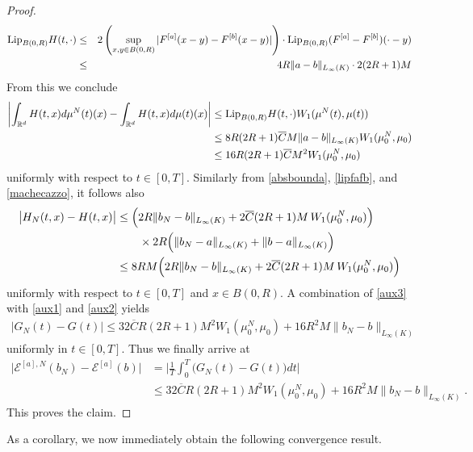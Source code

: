 \begin{proof}
\begin{eqnarray*}
\textup{Lip}_{B(0,R)}H(t,\cdot)&\leq& 2 \left (\sup_{x,y \in B(0,R)}|F^{[a]}(x-y)-F^{[b]}(x-y)| \right ) \cdot\textup{Lip}_{B(0,R)}(F^{[a]} -F^{[b]})(\cdot -y) \\
&\leq& 4R\|a-b\|_{L_\infty(K)}\cdot 2(2R+1)M
\end{eqnarray*}
	From this we conclude
	\begin{align}\label{aux1}
		\left|\int_{\mathbb{R}^d}H(t,x)d\mu^N(t)(x) - \int_{\mathbb{R}^d}H(t,x)d\mu(t)(x)\right|
			&\leq\textup{Lip}_{B(0,R)}H(t,\cdot)W_1(\mu^N(t),\mu(t))\nonumber\\
			&\leq 8R(2R+1)\overline{C}M\|a-b\|_{L_\infty(K)}W_1(\mu_0^N,\mu_0)\nonumber\\
			&\leq 16R(2R+1)\overline{C}M^2 W_1(\mu_0^N,\mu_0)
	\end{align}
	uniformly with respect to $t \in [0,T]$. Similarly from \eqref{absbounda}, \eqref{lipfafb}, and \eqref{machecazzo}, it follows also
	\begin{align}\label{aux2}
		\bigl|H_N(t,x)-H(t,x)\bigr|
			&\leq \Bigl(2R \| b_{N}-b\|_{L_\infty(K)}+2 \overline{C}(2R+1)M\,W_1(\mu_0^N,\mu_0)\Bigr)\nonumber\\
			&\qquad\times
				2R\Bigl(\|b_N-a\|_{L_\infty(K)}+\|b-a\|_{L_\infty(K)}\Bigr)\nonumber\\
			&\leq 8RM\Bigl(2R \| b_{N}-b\|_{L_\infty(K)}+2\overline{C}(2R+1)M\,W_1(\mu_0^N,\mu_0)\Bigr)
	\end{align}
	uniformly with respect to $t \in [0,T]$ and $x \in B(0,R)$. A combination of \eqref{aux3} with \eqref{aux1} and
	\eqref{aux2} yields
	\begin{align*}
		|G_N(t)-G(t)|
			\leq 32\overline{C}R(2R+1)M^2 W_1(\mu_0^N,\mu_0)+16R^2M\| b_{N}-b\|_{L_\infty(K)}
	\end{align*}
	uniformly in $t \in [0,T]$. Thus we finally arrive at
	\begin{align*}
		\bigl|\mathcal E^{[a],N}(b_N)-\mathcal E^{[a]}(b)\bigr|
			&=\biggl|\frac{1}{T}\int^T_0\bigl(G_N(t)-G(t)\bigr)dt\biggr|\\
			&\leq 32\overline{C}R(2R+1)M^2 W_1(\mu_0^N,\mu_0)+16R^2M\| b_{N}-b\|_{L_\infty(K)}.
	\end{align*}
	This proves the claim.

\end{proof}









As a corollary, we now immediately obtain the following convergence result.

